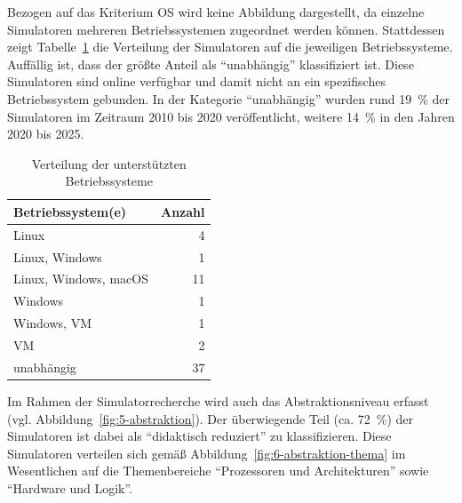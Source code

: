 Bezogen auf das Kriterium \ac{OS} wird keine Abbildung dargestellt, da einzelne Simulatoren mehreren Betriebssystemen zugeordnet werden können. Stattdessen zeigt Tabelle~\ref{tab:os} die Verteilung der Simulatoren auf die jeweiligen Betriebssysteme. Auffällig ist, dass der größte Anteil als \enquote{unabhängig} klassifiziert ist. Diese Simulatoren sind online verfügbar und damit nicht an ein spezifisches Betriebssystem gebunden. In der Kategorie \enquote{unabhängig} wurden rund 19~\% der Simulatoren im Zeitraum 2010 bis 2020 veröffentlicht, weitere 14~\% in den Jahren 2020 bis 2025.

\begin{table}[h]
	\centering
	\caption{Verteilung der unterstützten Betriebssysteme}
	\label{tab:os}
	\begin{tabular}{l r}
		\toprule
		\textbf{Betriebssystem(e)} & \textbf{Anzahl} \\
		\midrule
		Linux                     & 4  \\
		Linux, Windows            & 1  \\
		Linux, Windows, macOS     & 11 \\
		Windows                   & 1  \\
		Windows, \ac{VM}          & 1  \\
		\ac{VM}                   & 2  \\
		unabhängig                & 37 \\
		\bottomrule
	\end{tabular}
\end{table}

Im Rahmen der Simulatorrecherche wird auch das Abstraktionsniveau erfasst (vgl. Abbildung~\ref{fig:5-abstraktion}). Der überwiegende Teil (ca. 72~\%) der Simulatoren ist dabei als \enquote{didaktisch reduziert} zu klassifizieren. Diese Simulatoren verteilen sich gemäß Abbildung~\ref{fig:6-abstraktion-thema} im Wesentlichen auf die Themenbereiche \enquote{Prozessoren und Architekturen} sowie \enquote{Hardware und Logik}.

